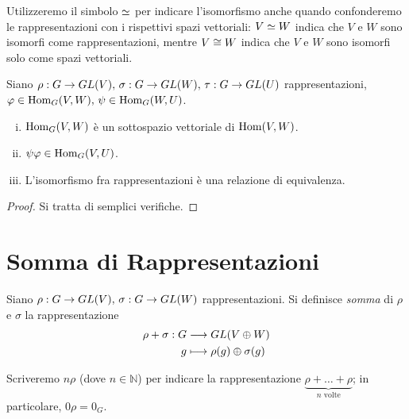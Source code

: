 Utilizzeremo il simbolo $\simeq$ per indicare l'isomorfismo anche quando confonderemo le rappresentazioni con i rispettivi spazi vettoriali: $V\simeq W$ indica che $V$ e $W$ sono isomorfi come rappresentazioni, mentre $V\cong W$ indica che $V$ e $W$ sono isomorfi solo come spazi vettoriali.

\begin{proposition}
Siano $\rho:G\to GL(V),\,\allowbreak\sigma:G\to GL(W),\,\allowbreak\tau:G\to GL(U)$ rappresentazioni, $\varphi\in\operatorname{Hom}_G(V,W),\,\allowbreak\psi\in\operatorname{Hom}_G(W,U)$.
\begin{enumerate}[(i)]
\item $\operatorname{Hom}_G(V,W)$ è un sottospazio vettoriale di $\operatorname{Hom}(V,W)$.
\item $\psi\varphi\in\operatorname{Hom}_G(V,U)$.
\item L'isomorfismo fra rappresentazioni è una relazione di equivalenza.
\end{enumerate}
\end{proposition}
\begin{proof}
Si tratta di semplici verifiche.
\end{proof}

\section{Somma di Rappresentazioni}

\begin{definition}
Siano $\rho:G\to GL(V),\,\allowbreak\sigma:G\to GL(W)$ rappresentazioni. Si definisce \emph{somma} di $\rho$ e $\sigma$ la rappresentazione
\begin{align*}
\rho+\sigma: G&\longrightarrow GL(V\oplus W)\\
g&\longmapsto\rho(g)\oplus\sigma(g)
\end{align*}
\end{definition}

Scriveremo $n\rho$ (dove $n\in\mathbb{N}$) per indicare la rappresentazione $\underbrace{\rho+\ldots+\rho}_{\text{$n$ volte}}$; in particolare, $0\rho=0_G$.

